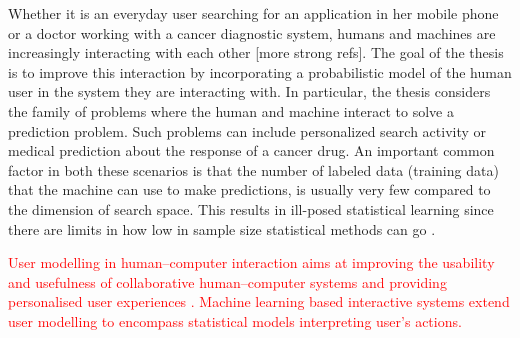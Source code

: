 \documentclass[dissertation,math,vertlayout,pdfa,colorlinks]{aaltoseries}
\begin{document}


Whether it is an everyday user searching for an application in her mobile phone or a doctor working with a cancer diagnostic system, humans and machines are increasingly interacting with each other \cite{amershi2014power} [more strong refs]. The goal of the thesis is to improve this interaction by incorporating a probabilistic model of the human user in the system they are interacting with. In particular, the thesis considers the family of problems where the human and machine interact to solve a prediction problem. Such problems can include personalized search activity or medical prediction about the response of a cancer drug. An important common factor in both these scenarios is that the number of labeled data (training data) that the machine can use to make predictions, is usually very few compared to the dimension of search space. This results in ill-posed statistical learning since there are limits in how low in sample size statistical methods can go \cite{Donoho2009observed}. 



\textcolor{red}{User modelling in human--computer interaction aims at improving the usability and usefulness of collaborative human--computer systems and providing personalised user experiences \cite{user_modelling_2001}. Machine learning based interactive systems extend user modelling to encompass statistical models interpreting user's actions.}


\end{document}
